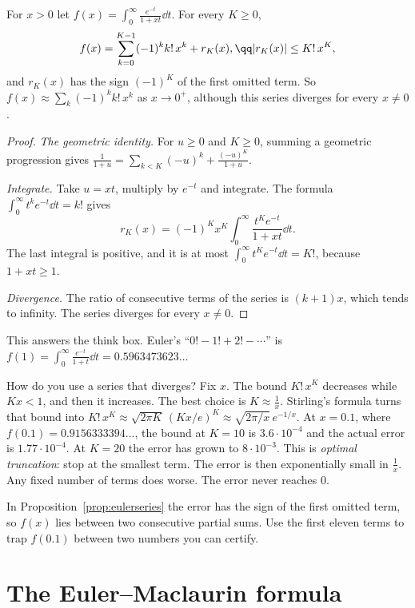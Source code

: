 \begin{proposition}\label{prop:eulerseries}
For $x>0$ let $f(x)=\displaystyle\int_0^\infty\frac{e^{-t}}{1+xt}\dd t$. For every $K\ge0$,
\[
\begin{gathered}f(x)=\sum_{k=0}^{K-1}(-1)^kk!\,x^k+r_K(x),\qq |r_K(x)|\le K!\,x^K,\end{gathered}
\]
and $r_K(x)$ has the sign $(-1)^K$ of the first omitted term. So $f(x)\approx\sum_k(-1)^kk!\,x^k$ as $x\to0^+$, although this series
diverges for every $x\ne0$.
\end{proposition}
\begin{proof}
\emph{The geometric identity.} For $u\ge0$ and $K\ge0$, summing a geometric progression gives $\frac1{1+u}=\sum_{k<K}(-u)^k+\frac{(-u)^K}{1+u}$.

\emph{Integrate.} Take $u=xt$, multiply by $e^{-t}$ and integrate. The formula $\int_0^\infty t^ke^{-t}\dd t=k!$ gives
\[
r_K(x)=(-1)^Kx^K\int_0^\infty\frac{t^Ke^{-t}}{1+xt}\dd t.
\]
The last integral is positive, and it is at most $\int_0^\infty t^Ke^{-t}\dd t=K!$, because $1+xt\ge1$.

\emph{Divergence.} The ratio of consecutive terms of the series is $(k+1)x$, which tends to infinity. The series diverges for every $x\ne0$.
\end{proof}

This answers the think box. Euler's ``$0!-1!+2!-\cdots$'' is $f(1)=\int_0^\infty\frac{e^{-t}}{1+t}\dd t=0.5963473623\ldots$

How do you use a series that diverges? Fix $x$. The bound $K!\,x^K$ decreases while $Kx<1$, and then it increases. The best choice is $K\approx\frac1x$. Stirling's formula turns that bound into $K!\,x^K\approx\sqrt{2\pi K}\,(Kx/e)^K\approx\sqrt{2\pi/x}\,e^{-1/x}$. At $x=0.1$, where $f(0.1)=0.9156333394\ldots$, the bound at $K=10$ is $3.6\cdot10^{-4}$ and the actual error is $1.77\cdot10^{-4}$. At $K=20$ the error has grown to $8\cdot10^{-3}$. This is \emph{optimal truncation}: stop at the smallest term. The error is then exponentially small in $\frac1x$. Any fixed number of terms does worse. The error never reaches $0$.

\begin{think}
In Proposition~\ref{prop:eulerseries} the error has the sign of the first omitted term, so $f(x)$ lies between two consecutive partial sums. Use the first eleven terms to trap $f(0.1)$ between two numbers you can certify.
\end{think}

\section{The Euler--Maclaurin formula}

